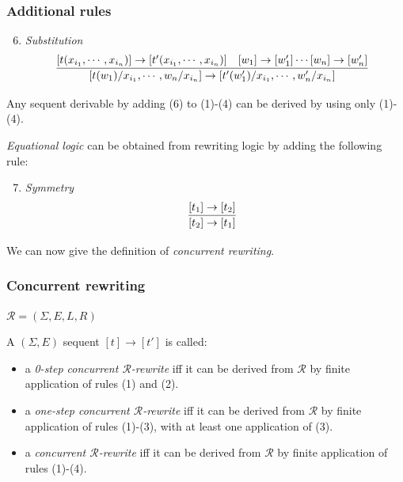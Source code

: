 \documentclass{beamer}
\begin{document}
\begin{frame}
    \frametitle{Additional rules}
    \scriptsize
    \begin{enumerate}
        \setcounter{enumi}{5}
        \item \emph{Substitution}
        $$
        \infer[]
        {[t(w_1)/x_{i_1},\cdots,w_n/x_{i_n}] \rightarrow [t'(w_1')/x_{i_1},\cdots,w_n'/x_{i_n}]}
        {[t(x_{i_1},\cdots,x_{i_n})] \rightarrow [t'(x_{i_1},\cdots,x_{i_n})] \quad [w_1] \rightarrow [w_1'] \cdots [w_n] \rightarrow [w_n']} 
        $$
    \end{enumerate}
    
    Any sequent derivable by adding (6) to  (1)-(4) can be derived by using only (1)-(4).

    \pause 
    \bigskip
    \emph{Equational logic} can be obtained  from rewriting logic by adding the following rule:
    \begin{enumerate}
        \setcounter{enumi}{6}
        \item \emph{Symmetry}
        $$
        \infer[]{[t_2] \rightarrow [t_1]}{[t_1] \rightarrow [t_2]} 
        $$
    \end{enumerate}
    \pause 
    
    \bigskip 
    We can now give the definition of \emph{concurrent rewriting}.
\end{frame}
\begin{frame}
    \frametitle{Concurrent rewriting}
    $\mathcal{R} = (\Sigma, E, L, R)$
    \small
    
    \pause
    \medskip
    A $(\Sigma, E)$ sequent $[t] \rightarrow [t']$ is called:\begin{itemize}
        \item a \emph{0-step concurrent $\mathcal{R}$-rewrite} iff it can be derived from $\mathcal{R}$ by finite application 
        of rules (1) and (2).
        \pause
        \item a \emph{one-step concurrent $\mathcal{R}$-rewrite} iff it can be derived from $\mathcal{R}$
        by finite application of rules (1)-(3), with at least one application of (3).
        \pause
        \item a \emph{concurrent $\mathcal{R}$-rewrite} iff it can be derived from $\mathcal{R}$ by finite application   of rules (1)-(4).
    \end{itemize}
\end{frame}
\end{document}
